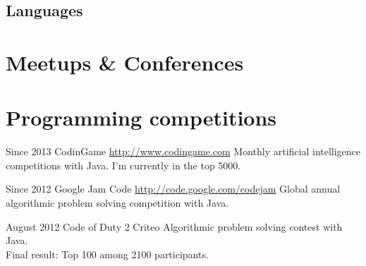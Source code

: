 \documentclass[11pt,a4paper]{moderncv}
\begin{document}
\subsection{Languages}


\section{Meetups \& Conferences}

\section{Programming competitions}

\cventry
{Since 2013}
{CodinGame}
{}
{\url{http://www.codingame.com}}
{}
{Monthly artificial intelligence competitions with Java. I'm currently in the top 5000.}

\cventry
{Since 2012}
{Google Jam Code}
{}
{\url{http://code.google.com/codejam}}
{}
{Global annual algorithmic problem solving competition with Java.}




\cventry
{August 2012}
{Code of Duty 2}
{Criteo}
{}
{}
{Algorithmic problem solving contest with Java.\\Final result: Top 100 among 2100 participants.}
\end{document}
